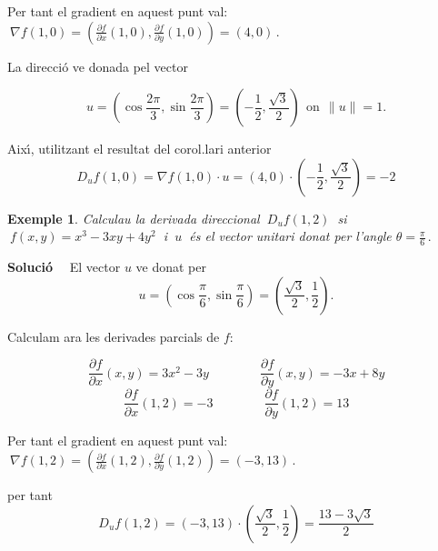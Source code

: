 \documentclass[12pt]{article}
\newcommand{\solucio}{\textbf{Soluci{\'o}}\ \ }
\newtheorem{exemple}{Exemple}[subsection]
\begin{document}
Per tant el gradient en aquest punt val: $\ \nabla f(1,0)=\left(\frac{\partial f}{\partial x}(1,0),\frac{\partial f}{\partial y}(1,0)\right)=(4,0)\,.$

La direcci{\'o} ve donada pel vector

\[
u=\left(\cos \frac{2\pi}{3},\sin \frac{2\pi}{3} \right)=\left(-\frac{1}{2},\frac{\sqrt{3}}{2}\right)\,\;
\mbox{on}\ \ \| u\| =1.
\]

Aix{\'\i}, utilitzant el resultat del corol.lari anterior
$$
D_uf(1,0)=\nabla f(1,0)\cdot u=(4,0)\cdot \left(-\frac{1}{2},\frac{\sqrt{3}}{2}\right)=-2
$$


\vspace{0.4cm}
\begin{exemple}
Calculau la derivada direccional $\ D_uf(1,2)\ $ si $\ f(x,y)=x^3 -3xy +
4y^2\ $ i $\ u\ $ {\'e}s el vector unitari donat per l'angle $\theta
=\frac{\pi}{6}\,.$
\end{exemple}

\solucio
El vector $u$ ve donat per
\[
u=\left(\cos \frac{\pi}{6},\sin \frac{\pi}{6}\right)= \left(\frac{\sqrt{3}}{2}
,\frac{1}{2}\right).
\]

Calculam ara les derivades parcials de $f$:

$$
\frac{\partial f}{\partial x}(x,y)=3 x^2-3y\qquad\qquad \frac{\partial f}{\partial y}(x,y)=-3x+8 y
$$
$$
\frac{\partial f}{\partial x}(1,2)=-3 \qquad\qquad \frac{\partial f}{\partial y}(1,2)=13
$$

Per tant el gradient en aquest punt val: $\ \nabla f(1,2)=\left(\frac{\partial f}{\partial x}(1,2),\frac{\partial f}{\partial y}(1,2)\right)=(-3,13)\,.$

per tant
\[
D_uf(1,2)=(-3,13)\cdot\left(\frac{\sqrt{3}}{2}
,\frac{1}{2}\right)= \frac{13-3\sqrt{3}}{2}
\]
\end{document}
